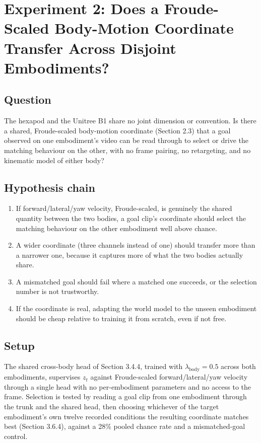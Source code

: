 \documentclass[12pt,a4paper,oneside]{report}
\begin{document}
\section{Experiment 2: Does a Froude-Scaled Body-Motion Coordinate Transfer Across Disjoint Embodiments?}

\subsection{Question}
The hexapod and the Unitree B1 share no joint dimension or convention. Is there a shared, Froude-scaled
body-motion coordinate (Section 2.3) that a goal observed on one embodiment's video can be read through to
select or drive the matching behaviour on the other, with no frame pairing, no retargeting, and no kinematic
model of either body?

\subsection{Hypothesis chain}
\begin{enumerate}[label=\arabic*.]
\item If forward/lateral/yaw velocity, Froude-scaled, is genuinely the shared quantity between the two bodies,
  a goal clip's coordinate should select the matching behaviour on the other embodiment well above chance.
\item A wider coordinate (three channels instead of one) should transfer more than a narrower one, because it
  captures more of what the two bodies actually share.
\item A mismatched goal should fail where a matched one succeeds, or the selection number is not trustworthy.
\item If the coordinate is real, adapting the world model to the unseen embodiment should be cheap relative to
  training it from scratch, even if not free.
\end{enumerate}

\subsection{Setup}
The shared cross-body head of Section 3.4.4, trained with $\lambda_{\text{body}}=0.5$ across both embodiments,
supervises $z_t$ against Froude-scaled forward/lateral/yaw velocity through a single head with no per-embodiment
parameters and no access to the frame. Selection is tested by reading a goal clip from one embodiment through
the trunk and the shared head, then choosing whichever of the target embodiment's own twelve recorded conditions
the resulting coordinate matches best (Section 3.6.4), against a 28\% pooled chance rate and a mismatched-goal
control.
\end{document}
